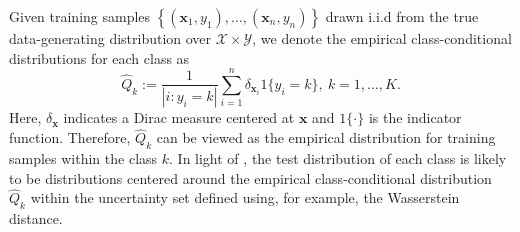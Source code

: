 \documentclass[journal]{IEEEtran}
\begin{document}
Given training samples $\left\{\left(\boldsymbol{x}_{1}, {y}_{1}\right),\ldots,\left(\boldsymbol{x}_{n}, {y}_{n}\right)\right\}$ drawn i.i.d from the true data-generating distribution over $\mathcal{X}\times\mathcal{Y}$,
we denote the empirical class-conditional distributions for each class as
\[
\widehat{Q}_k:= \frac{1}{|i:y_i=k|}\sum_{i=1}^n\delta_{\boldsymbol{x}_i}1\{y_i=k\}, \ k=1,\ldots,K.
\]
Here, $\delta_{\boldsymbol{x}}$ indicates a Dirac measure centered at $\boldsymbol{x}$ and $1\{\cdot\}$ is the indicator function.
Therefore, $\widehat{Q}_k$ can be viewed as the empirical distribution for training samples within the class $k$. 
In light of \cite{gao2018robust,zhu2020distributionally}, the test distribution of each class is likely to be distributions centered around the empirical class-conditional distribution $\widehat{Q}_k$ within the uncertainty set defined using, for example, the Wasserstein distance. 
\end{document}
